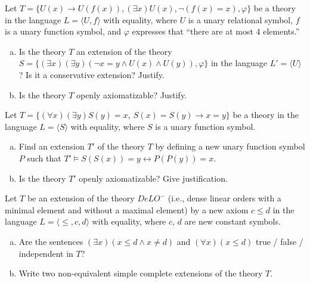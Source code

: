 \begin{problem}

    Let $T = \{U(x) \to U(f(x)), (\exists x)U(x), \neg (f(x) = x), \varphi\}$ be a theory in the language $L = \langle U, f \rangle$ with equality, where $U$ is a unary relational symbol, $f$ is a unary function symbol, and $\varphi$ expresses that ``there are at most 4 elements.''
    \begin{enumerate}[(a)]
        \item Is the theory $T$ an extension of the theory $S = \{ (\exists x)(\exists y)(\neg x = y \land U(x) \land U(y)), \varphi \}$ in the language $L' = \langle U \rangle$? Is it a conservative extension? Justify.
        \item Is the theory $T$ openly axiomatizable? Justify.    
    \end{enumerate}
\end{problem}


\begin{problem}

    Let $T=\{(\forall x)(\exists y) S(y)=x,\ S(x)=S(y)\to x=y\}$ be a theory in the language $L=\langle S\rangle$ with equality, where $S$ is a unary function symbol.
    \begin{enumerate}[(a)]
        \item Find an extension $T'$ of the theory $T$ by defining a new unary function symbol $P$ such that $T' \models S(S(x))=y \leftrightarrow P(P(y))=x$.
        \item Is the theory $T'$ openly axiomatizable? Give justification.
    \end{enumerate}

\end{problem} 


\begin{problem}

    Let $T$ be an extension of the theory $DeLO^-$ (i.e., dense linear orders with a minimal element and without a maximal element) by a new axiom $c \le d$ in the language $L=\langle \le,c,d\rangle$ with equality, where $c$, $d$ are new constant symbols.
    \begin{enumerate}[(a)]
        \item Are the sentences $(\exists x)(x\le d \wedge x \ne d)$ and $(\forall x)(x \le d)$ true / false / independent in $T$?
        \item Write two non-equivalent simple complete extensions of the theory $T$.
    \end{enumerate}
    
\end{problem}


